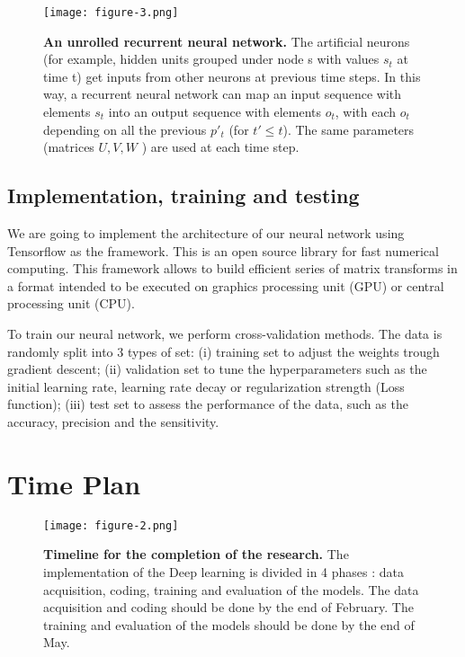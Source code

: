 \documentclass[12pt]{article}
\begin{document}
\begin{figure}[h]
    \centering
    \texttt{[image: figure-3.png]}
    \caption{ \textbf{An unrolled recurrent neural network.} The artificial neurons (for example, hidden units grouped under node s with values $s_t$ at time t) get inputs from other neurons at previous time steps. In this way, a recurrent neural network can map an input sequence with elements $s_t$ into an output sequence with elements $o_t$, with each $o_t$ depending on all the previous $p'_t$ (for $t'\leq t$). The same parameters (matrices $U,V,W$ ) are used at each time step. }
    \label{fig:RNN}
\end{figure}

\subsection{Implementation, training and testing}

We are going to implement the architecture of our neural network using Tensorflow\autocite{abadi2016} as the framework. This is an open source library for fast numerical computing. This framework allows to build efficient series of matrix transforms in a format intended to be executed on graphics processing unit (GPU) or central processing unit (CPU). 

To train our neural network, we perform cross-validation methods. The data is randomly split into 3 types of set: (i) training set to adjust the weights trough gradient descent; (ii) validation set to tune the hyperparameters such as the initial learning rate, learning rate decay or regularization strength (Loss function); (iii) test set to assess the performance of the data, such as the accuracy, precision and the sensitivity. 

\section{Time Plan}

\begin{figure}[h]
    \centering
    \texttt{[image: figure-2.png]}
    \caption{ \textbf{Timeline for the completion of the research.} The implementation of the Deep learning is divided in 4 phases : data acquisition, coding, training and evaluation of the models. The data acquisition and coding should be done by the end of February. The training and evaluation of the models should be done by the end of May.}
    \label{fig:plan}
\end{figure}
\end{document}
